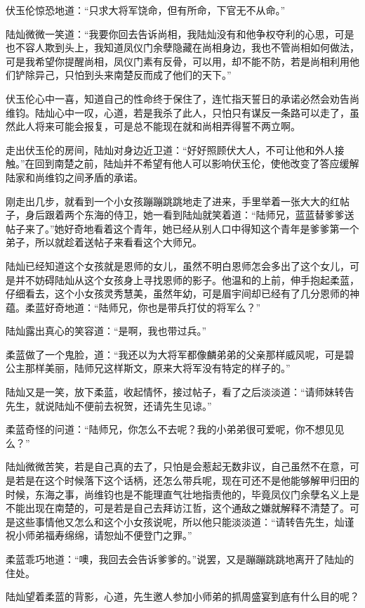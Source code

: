 伏玉伦惊恐地道：“只求大将军饶命，但有所命，下官无不从命。”

陆灿微微一笑道：“我要你回去告诉尚相，我陆灿没有和他争权夺利的心思，可是也不容人欺到头上，我知道凤仪门余孽隐藏在尚相身边，我也不管尚相如何做法，可是我希望你提醒尚相，凤仪门素有反骨，可以用，却不能不防，若是尚相利用他们铲除异己，只怕到头来南楚反而成了他们的天下。”

伏玉伦心中一喜，知道自己的性命终于保住了，连忙指天誓日的承诺必然会劝告尚维钧。陆灿心中一叹，心道，若是我杀了此人，只怕只有谋反一条路可以走了，虽然此人将来可能会报复，可是总不能现在就和尚相弄得誓不两立啊。

走出伏玉伦的房间，陆灿对身边近卫道：“好好照顾伏大人，不可让他和外人接触。”在回到南楚之前，陆灿并不希望有他人可以影响伏玉伦，使他改变了答应缓解陆家和尚维钧之间矛盾的承诺。

刚走出几步，就看到一个小女孩蹦蹦跳跳地走了进来，手里举着一张大大的红帖子，身后跟着两个东海的侍卫，她一看到陆灿就笑着道：“陆师兄，蓝蓝替爹爹送帖子来了。”她好奇地看着这个青年，她已经从别人口中得知这个青年是爹爹第一个弟子，所以就趁着送帖子来看看这个大师兄。

陆灿已经知道这个女孩就是恩师的女儿，虽然不明白恩师怎会多出了这个女儿，可是并不妨碍陆灿从这个女孩身上寻找恩师的影子。他温和的上前，伸手抱起柔蓝，仔细看去，这个小女孩灵秀慧美，虽然年幼，可是眉宇间却已经有了几分恩师的神蕴。柔蓝好奇地道：“陆师兄，你也是带兵打仗的将军么？”

陆灿露出真心的笑容道：“是啊，我也带过兵。”

柔蓝做了一个鬼脸，道：“我还以为大将军都像麟弟弟的父亲那样威风呢，可是碧公主那样美丽，陆师兄这样斯文，原来大将军没有特定的样子的。”

陆灿又是一笑，放下柔蓝，收起情怀，接过帖子，看了之后淡淡道：“请师妹转告先生，就说陆灿不便前去祝贺，还请先生见谅。”

柔蓝奇怪的问道：“陆师兄，你怎么不去呢？我的小弟弟很可爱呢，你不想见见么？”

陆灿微微苦笑，若是自己真的去了，只怕是会惹起无数非议，自己虽然不在意，可是若是在这个时候落下这个话柄，还怎么带兵呢，现在可还不是他能够解甲归田的时候，东海之事，尚维钧也是不能理直气壮地指责他的，毕竟凤仪门余孽名义上是不能出现在南楚的，可是若是自己去拜访江哲，这个通敌之嫌就解释不清楚了。可是这些事情他又怎么和这个小女孩说呢，所以他只能淡淡道：“请转告先生，灿谨祝小师弟福寿绵绵，请恕灿不便登门之罪。”

柔蓝乖巧地道：“噢，我回去会告诉爹爹的。”说罢，又是蹦蹦跳跳地离开了陆灿的住处。

陆灿望着柔蓝的背影，心道，先生邀人参加小师弟的抓周盛宴到底有什么目的呢？


